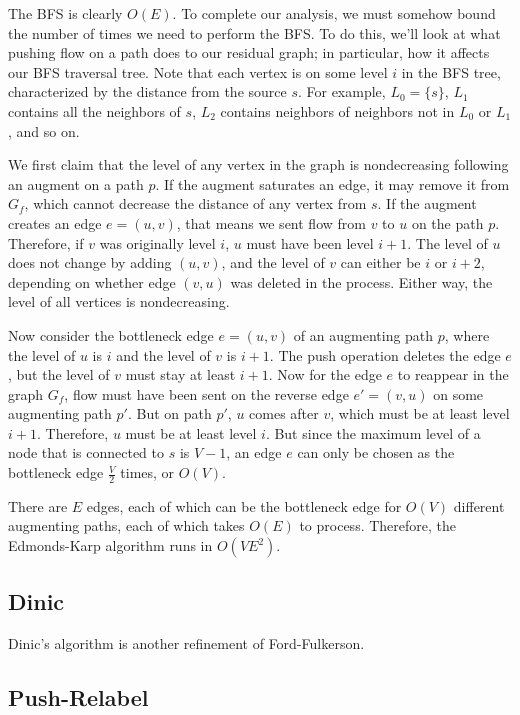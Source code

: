 The BFS is clearly $O(E)$. To complete our analysis, we must somehow bound the number of times we need to perform the BFS. To do this, we'll look at what pushing flow on a path does to our residual graph; in particular, how it affects our BFS traversal tree. Note that each vertex is on some level $i$ in the BFS tree, characterized by the distance from the source $s$. For example, $L_0 = \{s\}$, $L_1$ contains all the neighbors of $s$, $L_2$ contains neighbors of neighbors not in $L_0$ or $L_1$, and so on.

We first claim that the level of any vertex in the graph is nondecreasing following an augment on a path $p$. If the augment saturates an edge, it may remove it from $G_f$, which cannot decrease the distance of any vertex from $s$. If the augment creates an edge $e=(u,v)$, that means we sent flow from $v$ to $u$ on the path $p$. Therefore, if $v$ was originally level $i$, $u$ must have been level $i+1$. The level of $u$ does not change by adding $(u,v)$, and the level of $v$ can either be $i$ or $i+2$, depending on whether edge $(v,u)$ was deleted in the process. Either way, the level of all vertices is nondecreasing.

Now consider the bottleneck edge $e=(u,v)$ of an augmenting path $p$, where the level of $u$ is $i$ and the level of $v$ is $i+1$. The push operation deletes the edge $e$, but the level of $v$ must stay at least $i+1$. Now for the edge $e$ to reappear in the graph $G_f$, flow must have been sent on the reverse edge $e'=(v,u)$ on some augmenting path $p'$. But on path $p'$, $u$ comes after $v$, which must be at least level $i+1$. Therefore, $u$ must be at least level $i$. But since the maximum level of a node that is connected to $s$ is $V-1$, an edge $e$ can only be chosen as the bottleneck edge $\frac{V}{2}$ times, or $O(V)$.

There are $E$ edges, each of which can be the bottleneck edge for $O(V)$ different augmenting paths, each of which takes $O(E)$ to process. Therefore, the Edmonds-Karp algorithm runs in $O(VE^2)$.

\subsection{Dinic}

Dinic's algorithm is another refinement of Ford-Fulkerson.

\subsection{Push-Relabel}

